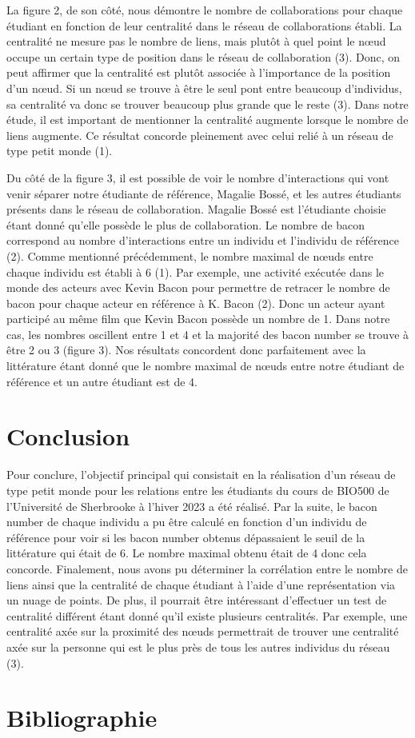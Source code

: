 \documentclass[
]{article}
\begin{document}
La figure 2, de son côté, nous démontre le nombre de collaborations pour
chaque étudiant en fonction de leur centralité dans le réseau de
collaborations établi. La centralité ne mesure pas le nombre de liens,
mais plutôt à quel point le nœud occupe un certain type de position dans
le réseau de collaboration (3). Donc, on peut affirmer que la centralité
est plutôt associée à l'importance de la position d'un nœud. Si un nœud
se trouve à être le seul pont entre beaucoup d'individus, sa centralité
va donc se trouver beaucoup plus grande que le reste (3). Dans notre
étude, il est important de mentionner la centralité augmente lorsque le
nombre de liens augmente. Ce résultat concorde pleinement avec celui
relié à un réseau de type petit monde (1).

Du côté de la figure 3, il est possible de voir le nombre d'interactions
qui vont venir séparer notre étudiante de référence, Magalie Bossé, et
les autres étudiants présents dans le réseau de collaboration. Magalie
Bossé est l'étudiante choisie étant donné qu'elle possède le plus de
collaboration. Le nombre de bacon correspond au nombre d'interactions
entre un individu et l'individu de référence (2). Comme mentionné
précédemment, le nombre maximal de nœuds entre chaque individu est
établi à 6 (1). Par exemple, une activité exécutée dans le monde des
acteurs avec Kevin Bacon pour permettre de retracer le nombre de bacon
pour chaque acteur en référence à K. Bacon (2). Donc un acteur ayant
participé au même film que Kevin Bacon possède un nombre de 1. Dans
notre cas, les nombres oscillent entre 1 et 4 et la majorité des bacon
number se trouve à être 2 ou 3 (figure 3). Nos résultats concordent donc
parfaitement avec la littérature étant donné que le nombre maximal de
nœuds entre notre étudiant de référence et un autre étudiant est de 4.

\hypertarget{conclusion}{%
\section{Conclusion}\label{conclusion}}

Pour conclure, l'objectif principal qui consistait en la réalisation
d'un réseau de type petit monde pour les relations entre les étudiants
du cours de BIO500 de l'Université de Sherbrooke à l'hiver 2023 a été
réalisé. Par la suite, le bacon number de chaque individu a pu être
calculé en fonction d'un individu de référence pour voir si les bacon
number obtenus dépassaient le seuil de la littérature qui était de 6. Le
nombre maximal obtenu était de 4 donc cela concorde. Finalement, nous
avons pu déterminer la corrélation entre le nombre de liens ainsi que la
centralité de chaque étudiant à l'aide d'une représentation via un nuage
de points. De plus, il pourrait être intéressant d'effectuer un test de
centralité différent étant donné qu'il existe plusieurs centralités. Par
exemple, une centralité axée sur la proximité des nœuds permettrait de
trouver une centralité axée sur la personne qui est le plus près de tous
les autres individus du réseau (3).

\newpage

\hypertarget{bibliographie}{%
\section*{Bibliographie}\label{bibliographie}}
\end{document}
